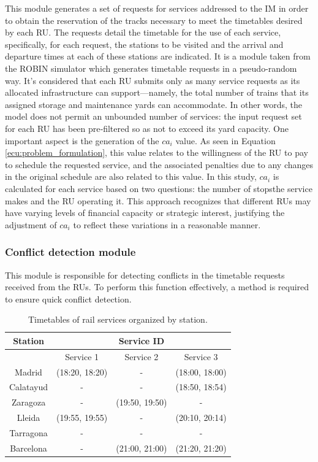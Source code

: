 \documentclass[Afour,sagev,times]{sagej}
\begin{document}
This module generates a set of requests for services addressed to the \gls{IM} in order to obtain the reservation of the tracks necessary to meet the timetables desired by each \gls{RU}. The requests detail the timetable for the use of each service, specifically, for each request, the stations to be visited and the arrival and departure times at each of these stations are indicated. It is a module taken from the ROBIN \cite{delCastillo24} simulator which generates timetable requests in a pseudo-random way. It's considered that each \gls{RU} submits only as many service requests as its allocated infrastructure can support—namely, the total number of trains that its assigned storage and maintenance yards can accommodate. In other words, the model does not permit an unbounded number of services: the input request set for each \gls{RU} has been pre‐filtered so as not to exceed its yard capacity. One important aspect is the generation of the $ ca_i $ value. As seen in Equation \ref{ecu:problem_formulation}, this value relates to the willingness of the \gls{RU} to pay to schedule the requested service, and the associated penalties due to any changes in the original schedule are also related to this value. In this study, $ ca_i $ is calculated for each service based on two questions: the number of stopsthe service makes and the \gls{RU} operating it. This approach recognizes that different \glspl{RU} may have varying levels of financial capacity or strategic interest, justifying the adjustment of $ ca_i $ to reflect these variations in a reasonable manner.

\subsubsection{Conflict detection module}
\label{sec:conflict_detection_module}

This module is responsible for detecting conflicts in the timetable requests received from the \glspl{RU}. To perform this function effectively, a method is required to ensure quick conflict detection. 

\begin{table}[ht]
\centering
\caption{Timetables of rail services organized by station.}
\begin{tabular}{@{}cccc@{}}
\toprule
Station   & \multicolumn{3}{c}{Service ID} \\ \midrule
           & Service 1 & Service 2  & Service 3 \\ \midrule
Madrid     & (18:20, 18:20) &      -       & (18:00, 18:00)  \\
Calatayud  &       -       &      -       & (18:50, 18:54)  \\
Zaragoza   &       -       & (19:50, 19:50) &       -        \\
Lleida     & (19:55, 19:55) &       -      & (20:10, 20:14)  \\
Tarragona  &       -       &      -       &       -        \\
Barcelona  &       -       & (21:00, 21:00) & (21:20, 21:20)  \\ \bottomrule
\end{tabular}
\label{tab:servicios_ferroviarios}
\end{table}
\end{document}
